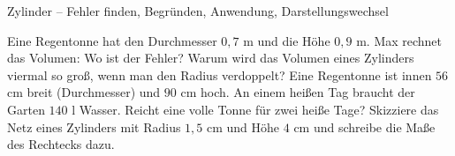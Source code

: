 \begin{aufgabe}{Zylinder – Fehler finden, Begründen, Anwendung, Darstellungswechsel}
\begin{teile}
\teil Eine Regentonne hat den Durchmesser $0{,}7$ m und die Höhe $0{,}9$ m. Max rechnet das Volumen:  Wo ist der Fehler?
\teil Warum wird das Volumen eines Zylinders viermal so groß, wenn man den Radius verdoppelt?
\teil Eine Regentonne ist innen $56$ cm breit (Durchmesser) und $90$ cm hoch. An einem heißen Tag braucht der Garten $140$ l Wasser. Reicht eine volle Tonne für zwei heiße Tage?
\teil Skizziere das Netz eines Zylinders mit Radius $1{,}5$ cm und Höhe $4$ cm und schreibe die Maße des Rechtecks dazu.

\end{teile}
\end{aufgabe}
